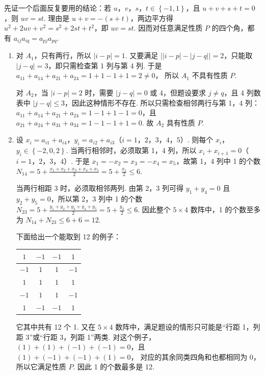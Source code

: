 \documentclass[UTF8,a4paper,oneside,11pt]{ctexbook}
\begin{document}
\begin{solution}
先证一个后面反复要用的结论：若 \(u\)，\(v\)，\(s\)，\(t\in \left\{ -1,1 \right\}\)，且 \( u+v+s+t=0 \)，则 \( uv=st \). 理由是 \( u+v=-(s+t) \)，两边平方得 \( u^2+2uv+v^2=s^2+2st+t^2 \)，即 \( uv=st \). 因而对任意满足性质 \(P\) 的四个角，都有 \( a_{ij}a_{iq}=a_{pj}a_{pq} \).

\begin{enumerate}
\item 对 \(A_1\)，只有两行，所以 \( \left| i-p \right|=1 \). 又要满足 \( \left| \left| i-p \right|-\left| j-q \right| \right|=2 \)，只能取 \( \left| j-q \right|=3 \)，即只需检查第 1 列与第 4 列. 于是 \( a_{11}+a_{14}+a_{21}+a_{24}=1+1-1+1=2\ne 0 \)，
所以 \(A_1\) 不具有性质 \(P\).

对 \(A_2\)，当 \( \left| i-p \right|=2 \) 时，需要 \( \left| j-q \right|=0 \) 或 4，但题设要求 \( j\ne q \)，且 4 列数表中 \( \left| j-q \right| \le 3 \)，因此这种情形不存在. 所以只需检查相邻两行与第 1，4 列：\( a_{11}+a_{14}+a_{21}+a_{24}=1-1+1-1=0 \)，且 \( a_{21}+a_{24}+a_{31}+a_{34}=1-1-1+1=0 \).
故 \(A_2\) 具有性质 \(P\).

\item 设 \( x_i=a_{i1}+a_{i4} \)，\( y_i=a_{i2}+a_{i3} \)（\(i=1\)，\(2\)，\(3\)，\(4\)，\(5\)）.
则每个 \(x_i\)，\(y_i\in \left\{ -2,0,2 \right\}\).
当两行相邻时，必须取第 1，4 列，所以 \( x_i+x_{i+1}=0 \)（\(i=1\)，\(2\)，\(3\)，\(4\)）. 于是 \( x_1=-x_2=x_3=-x_4=x_5 \)，故第 1，4 列中 1 的个数 \( N_{14}=5+\frac{x_1+x_2+x_3+x_4+x_5}{2}=5+\frac{x_1}{2}\le 6 \).

当两行相距 3 时，必须取相邻两列. 由第 2，3 列可得 \( y_1+y_4=0 \) 且 \( y_2+y_5=0 \)，所以第 2，3 列中 1 的个数 \( N_{23}=5+\frac{y_1+y_2+y_3+y_4+y_5}{2}=5+\frac{y_3}{2}\le 6 \).
因此整个 \( 5\times 4 \) 数阵中，1 的个数至多为 \( N_{14}+N_{23}\le 6+6=12 \).

下面给出一个能取到 12 的例子：
\begin{center}
\begin{tabular}{|c|c|c|c|}
\hline
\(1\) & \(-1\) & \(-1\) & \(1\) \\
\hline
\(-1\) & \(1\) & \(1\) & \(-1\) \\
\hline
\(1\) & \(1\) & \(1\) & \(1\) \\
\hline
\(-1\) & \(1\) & \(1\) & \(-1\) \\
\hline
\(1\) & \(-1\) & \(-1\) & \(1\) \\
\hline
\end{tabular}
\end{center}
它其中共有 12 个 1. 又在 \( 5\times 4 \) 数阵中，满足题设的情形只可能是“行距 1，列距 3”或“行距 3，列距 1”两类. 对这个例子，\( \left( 1 \right)+\left( 1 \right)+\left( -1 \right)+\left( -1 \right)=0 \)，且 \( \left( 1 \right)+\left( -1 \right)+\left( -1 \right)+\left( 1 \right)=0 \)，
对应的其余同类四角和也都相同为 0，所以它满足性质 \(P\). 因此 1 的个数最多是 12.


\end{enumerate}
\end{solution}
\end{document}
